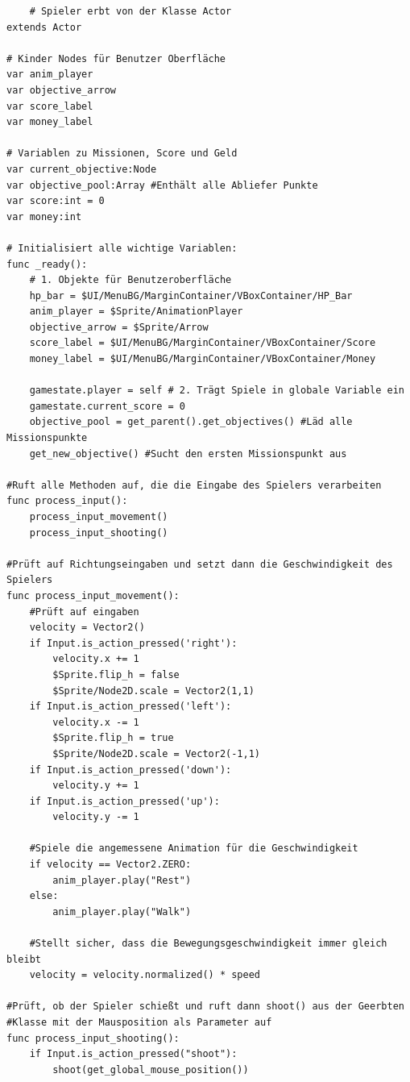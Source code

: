 \documentclass{article}
\begin{document}
	\begin{verbatim}
	# Spieler erbt von der Klasse Actor
extends Actor

# Kinder Nodes für Benutzer Oberfläche
var anim_player
var objective_arrow
var score_label
var money_label

# Variablen zu Missionen, Score und Geld
var current_objective:Node
var objective_pool:Array #Enthält alle Abliefer Punkte
var score:int = 0
var money:int

# Initialisiert alle wichtige Variablen:
func _ready():
    # 1. Objekte für Benutzeroberfläche
    hp_bar = $UI/MenuBG/MarginContainer/VBoxContainer/HP_Bar
    anim_player = $Sprite/AnimationPlayer
    objective_arrow = $Sprite/Arrow
    score_label = $UI/MenuBG/MarginContainer/VBoxContainer/Score
    money_label = $UI/MenuBG/MarginContainer/VBoxContainer/Money
    
    gamestate.player = self # 2. Trägt Spiele in globale Variable ein
    gamestate.current_score = 0
    objective_pool = get_parent().get_objectives() #Läd alle Missionspunkte
    get_new_objective() #Sucht den ersten Missionspunkt aus

#Ruft alle Methoden auf, die die Eingabe des Spielers verarbeiten
func process_input():
    process_input_movement()
    process_input_shooting()

#Prüft auf Richtungseingaben und setzt dann die Geschwindigkeit des Spielers 
func process_input_movement():
    #Prüft auf eingaben
    velocity = Vector2()
    if Input.is_action_pressed('right'):
        velocity.x += 1
        $Sprite.flip_h = false
        $Sprite/Node2D.scale = Vector2(1,1)
    if Input.is_action_pressed('left'):
        velocity.x -= 1
        $Sprite.flip_h = true
        $Sprite/Node2D.scale = Vector2(-1,1)
    if Input.is_action_pressed('down'):
        velocity.y += 1
    if Input.is_action_pressed('up'):
        velocity.y -= 1
    
    #Spiele die angemessene Animation für die Geschwindigkeit
    if velocity == Vector2.ZERO:
        anim_player.play("Rest")
    else:
        anim_player.play("Walk")

    #Stellt sicher, dass die Bewegungsgeschwindigkeit immer gleich bleibt	
    velocity = velocity.normalized() * speed 

#Prüft, ob der Spieler schießt und ruft dann shoot() aus der Geerbten
#Klasse mit der Mausposition als Parameter auf
func process_input_shooting():
    if Input.is_action_pressed("shoot"):
        shoot(get_global_mouse_position())


\end{verbatim}
\end{document}
